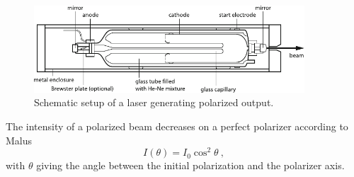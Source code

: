 \begin{figure}[H]
	\centering
	\includegraphics[width=0.90\textwidth]{content/graphics/setup.pdf}
	\caption{Schematic setup of a \HeNe laser generating polarized output. \cite{Eichler_2018}}
	\label{fig:setup}
\end{figure}

The intensity of a polarized beam decreases on a perfect polarizer according to Malus
\begin{equation*}
	I(\theta) = I_0 \cos^2\theta \: ,
\end{equation*}
with $\theta$ giving the angle between the initial polarization and the polarizer axis.



